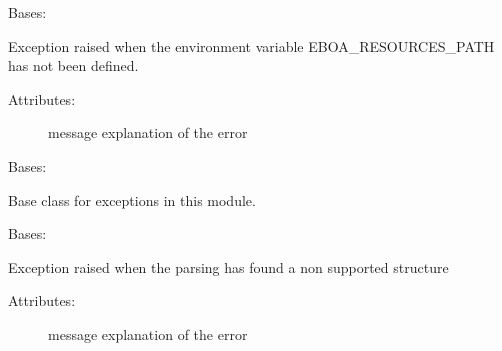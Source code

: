 \begin{fulllineitems}
\label{\detokenize{eboa.engine:eboa.engine.errors.EboaResourcesPathNotAvailable}}
Bases: {\hyperref[\detokenize{eboa.engine:eboa.engine.errors.Error}]{}}

Exception raised when the environment variable EBOA\_RESOURCES\_PATH has not been defined.
\begin{description}
\item[{Attributes:}] \leavevmode
message \textendash{} explanation of the error

\end{description}

\end{fulllineitems}


\begin{fulllineitems}
\label{\detokenize{eboa.engine:eboa.engine.errors.Error}}
Bases: 

Base class for exceptions in this module.

\end{fulllineitems}


\begin{fulllineitems}
\label{\detokenize{eboa.engine:eboa.engine.errors.ErrorParsingDictionary}}
Bases: {\hyperref[\detokenize{eboa.engine:eboa.engine.errors.Error}]{}}

Exception raised when the parsing has found a non supported structure
\begin{description}
\item[{Attributes:}] \leavevmode
message \textendash{} explanation of the error

\end{description}

\end{fulllineitems}

